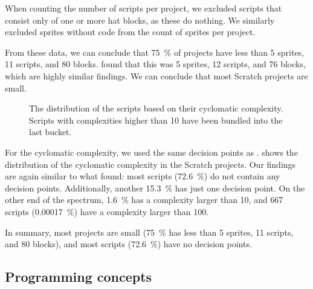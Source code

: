 \documentclass[../main]{subfiles}
\begin{document}
When counting the number of scripts per project, we excluded scripts that consist only of one or more hat blocks, as these do nothing.
We similarly excluded sprites without code from the count of sprites per project.

From these data, we can conclude that \qty{75}{\percent} of projects have less than 5 sprites, 11 scripts, and 80 blocks.
\Textcite{aivaloglouHowKidsCode2016} found that this was 5 sprites, 12 scripts, and 76 blocks, which are highly similar findings.
We can conclude that most Scratch projects are small.

\begin{figure}
    \begin{wide}
        
    \end{wide}
    \caption{
        The distribution of the scripts based on their cyclomatic complexity.
        Scripts with complexities higher than 10 have been bundled into the last bucket.
    }
    \label{fig:scratch-cc}
\end{figure}


For the cyclomatic complexity, we used the same decision points as \textcite{aivaloglouHowKidsCode2016}.
 shows the distribution of the cyclomatic complexity in the Scratch projects.
Our findings are again similar to what \textcite{aivaloglouHowKidsCode2016} found: most scripts (\qty{72.6}{\percent}) do not contain any decision points.
Additionally, another \qty{15.3}{\percent} has just one decision point.
On the other end of the spectrum, \qty{1.6}{\percent} has a complexity larger than 10, and 667 scripts (\qty{0.00017}{\percent}) have a complexity larger than 100.

In summary, most projects are small (\qty{75}{\percent} has less than 5 sprites, 11 scripts, and 80 blocks), and most scripts (\qty{72.6}{\percent}) have no decision points.

\subsection{Programming concepts}\label{subsec:programming-concepts}
\end{document}
